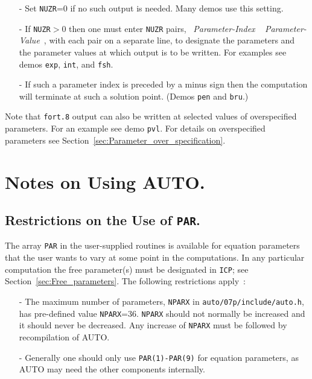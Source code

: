 \documentclass[12pt]{report}
\begin{document}
\begin{itemize}
\item[-]
 Set {\tt NUZR}=0 if no such output is needed. Many demos use this setting.
\item[-]
 If {\tt NUZR}$>$0 then one must enter {\tt NUZR} pairs,
            ~{\it Parameter-Index} ~ {\it Parameter-Value}~,
 with each pair on a separate line, to designate the parameters and the parameter
 values at which output is to be written.
 For examples see demos {\tt exp}, {\tt int}, and {\tt fsh}.
\item[-]
 If such a parameter index is preceded by a minus sign then the computation will
 terminate at such a solution point.
 (Demos {\tt pen} and {\tt bru}.)
\end{itemize}

Note that {\tt fort.8} output can also be written at selected values of 
overspecified parameters. For an example see demo {\tt pvl}.
For details on overspecified parameters see 
Section~\ref{sec:Parameter_over_specification}.
 

\chapter{ Notes on Using {\cal AUTO}.}  \label{ch:Notes_on_Using_AUTO}
\section{ Restrictions on the Use of {\tt PAR}.} \label{sec:Restrictions_on_PAR}
The array {\tt PAR} in the user-supplied routines is available
for equation parameters that the user wants to vary at some point
in the computations.
In any particular computation the free parameter(s) must be designated
in {\tt ICP}; see Section~\ref{sec:Free_parameters}.
The following restrictions apply~:

\begin{itemize}
\item[-]
  The maximum number of parameters, {\tt NPARX} in {\tt auto/07p/include/auto.h},
  has pre-defined value {\tt NPARX}=36.  {\tt NPARX} should not normally be increased
  and it should never be decreased.
  Any increase of {\tt NPARX} must be followed by recompilation of {\cal AUTO}.
\item[-]
  Generally one should only use {\tt PAR(1)-PAR(9)} for equation parameters,
  as {\cal AUTO} may need the other components internally.  
\end{itemize}
\end{document}
